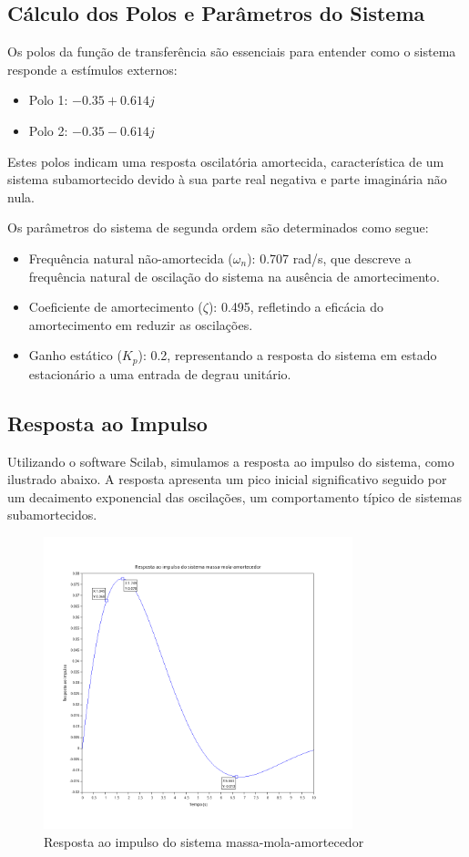 \subsection{Cálculo dos Polos e Parâmetros do Sistema}
Os polos da função de transferência são essenciais para entender como o sistema responde a estímulos externos:
\begin{itemize}
    \item Polo 1: \( -0.35 + 0.614j \)
    \item Polo 2: \( -0.35 - 0.614j \)
\end{itemize}
Estes polos indicam uma resposta oscilatória amortecida, característica de um sistema subamortecido devido à sua parte real negativa e parte imaginária não nula.

Os parâmetros do sistema de segunda ordem são determinados como segue:
\begin{itemize}
    \item Frequência natural não-amortecida (\( \omega_n \)): 0.707 rad/s, que descreve a frequência natural de oscilação do sistema na ausência de amortecimento.
    \item Coeficiente de amortecimento (\( \zeta \)): 0.495, refletindo a eficácia do amortecimento em reduzir as oscilações.
    \item Ganho estático (\( K_p \)): 0.2, representando a resposta do sistema em estado estacionário a uma entrada de degrau unitário.
\end{itemize}

\subsection{Resposta ao Impulso}
Utilizando o software Scilab, simulamos a resposta ao impulso do sistema, como ilustrado abaixo. A resposta apresenta um pico inicial significativo seguido por um decaimento exponencial das oscilações, um comportamento típico de sistemas subamortecidos.
\begin{figure}[H]
    \centering
    \includegraphics[width=0.8\textwidth]{atividades/3-atividade/assets/resposta-ao-impulso.png}
    \caption{Resposta ao impulso do sistema massa-mola-amortecedor}
\end{figure}


